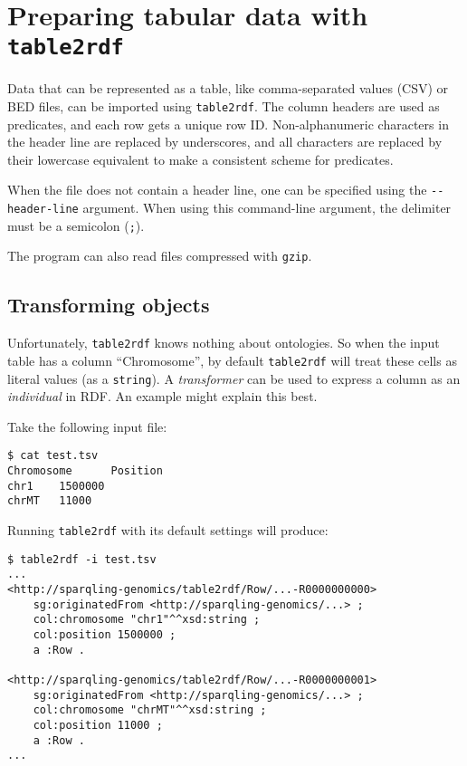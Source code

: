 \section{Preparing tabular data with \texttt{table2rdf}}
\label{sec:table2rdf}

  Data that can be represented as a table, like comma-separated values (CSV)
  or BED files, can be imported using \texttt{table2rdf}.  The column headers
  are used as predicates, and each row gets a unique row ID.  Non-alphanumeric
  characters in the header line are replaced by underscores, and all characters
  are replaced by their lowercase equivalent to make a consistent scheme for
  predicates.

  When the file does not contain a header line, one can be specified using the
  \texttt{-{}-header-line} argument.  When using this command-line argument, the
  delimiter must be a semicolon (\texttt{;}).

  The program can also read files compressed with \texttt{gzip}.

\subsection{Transforming objects}

  Unfortunately, \texttt{table2rdf} knows nothing about ontologies.  So when
  the input table has a column ``Chromosome'', by default \texttt{table2rdf}
  will treat these cells as literal values (as a \texttt{string}).  A
  \emph{transformer} can be used to express a column as an \emph{individual} in
  RDF.  An example might explain this best.

  Take the following input file:
\begin{siderules}
\begin{verbatim}
$ cat test.tsv
Chromosome      Position
chr1    1500000
chrMT   11000
\end{verbatim}
\end{siderules}

  Running \texttt{table2rdf} with its default settings will produce:

\begin{siderules}
\begin{verbatim}
$ table2rdf -i test.tsv
...
<http://sparqling-genomics/table2rdf/Row/...-R0000000000>
    sg:originatedFrom <http://sparqling-genomics/...> ;
    col:chromosome "chr1"^^xsd:string ;
    col:position 1500000 ;
    a :Row .

<http://sparqling-genomics/table2rdf/Row/...-R0000000001>
    sg:originatedFrom <http://sparqling-genomics/...> ;
    col:chromosome "chrMT"^^xsd:string ;
    col:position 11000 ;
    a :Row .
...
\end{verbatim}
\end{siderules}

